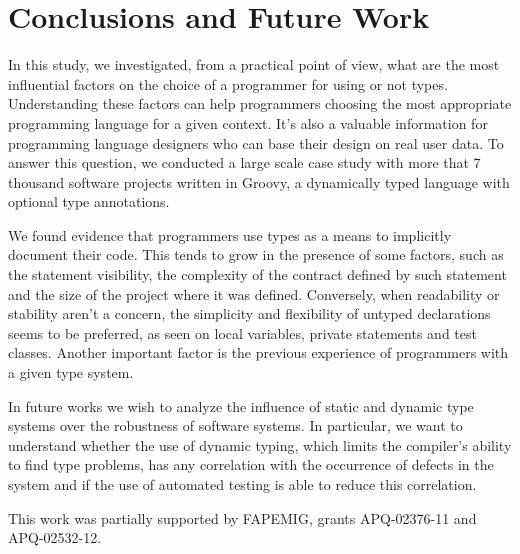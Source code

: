 \documentclass[preprint]{sigplanconf}
\begin{document}
%
%
\section{Conclusions and Future Work\label{conclusion}}
In this study, we investigated, from a practical point of view, what are the most influential factors on the choice of a programmer for using or not types.
Understanding these factors can help programmers choosing the most appropriate programming language for a given context.
It's also a valuable information for programming language designers who can base their design on real user data.
To answer this question, we conducted a large scale case study with more that 7 thousand software projects written in Groovy, a dynamically typed language with optional type annotations. 

We found evidence that programmers use types as a means to implicitly document their code.
This tends to grow in the presence of some factors, such as the statement visibility, the complexity of the contract defined by such statement and the size of the project where it was defined. 
Conversely, when readability or stability aren't a concern, the simplicity and flexibility of untyped declarations seems to be preferred, as seen on local variables, private statements and test classes.
Another important factor is the previous experience of programmers with a given type system.

In future works we wish to analyze the influence of static and dynamic type systems over the robustness of software systems.
In particular, we want to understand whether the use of dynamic typing, which limits the compiler's ability to find type problems, has any correlation with the occurrence of defects in the system and if the use of automated testing is able to reduce this correlation.


\acks
This work was partially supported by FAPEMIG, grants APQ-02376-11 and APQ-02532-12.

\newpage 
\end{document}
